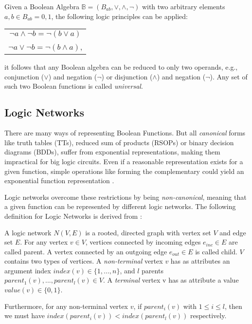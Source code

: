 \begin{definition}
	Given a Boolean Algebra $\mathbb{B} = (B_{ab}, \vee, \wedge, \neg)$ with two arbitrary elements $a,b \in B_{ab} = {0, 1}$, the following logic principles can be applied:
	\begin{table}[h]
		\centering
		\begin{tabular}{c}
			$\neg a \wedge \neg b = \neg (b \vee a)$ \\
			$\neg a \vee \neg b = \neg (b \wedge a)$,
		\end{tabular}
	\end{table}
\end{definition}

it follows that any Boolean algebra can be reduced to only two operands, e.g., conjunction ($\vee$) and negation ($\neg$) or disjunction ($\wedge$) and negation ($\neg$). Any set of such two Boolean functions is called \textit{universal}.

\subsection{Logic Networks}

There are many ways of representing Boolean Functions. But all \textit{canonical} forms like truth tables (TTs), reduced sum of products (RSOPs) or binary decision diagrams (BDDs), suffer from exponential representations, making them impractical for big logic circuits. Even if a reasonable representation exists for a given function, simple operations like forming the complementary could yield an exponential function representation \cite{canonical}.

Logic networks overcome these restrictions by being \textit{non-canonical}, meaning that a given function can be represented by different logic networks. The following definition for Logic Networks is derived from \cite{LogicNetwork}:

\begin{definition}
	A logic network $N(V, E)$ is a rooted, directed graph with vertex set $V$ and edge set $E$. For any vertex $v \in V$, vertices connected by incoming edges $e_{inc} \in E$ are called parent. A vertex connected by an outgoing edge $e_{out} \in E$ is called child.
	$V$ contains two types of vertices. A \textit{non-terminal} vertex $v$ has as attributes an argument index $index(v) \in \{1, . . .,n\}$, and $l$ parents $parent_1(v), ..., parent_l(v) \in V$. 
	A \textit{terminal} vertex v has as attribute a value $value(v)\in\{0,1\}$.
	
	Furthermore, for any non-terminal vertex $v$, if $parent_i(v)$ with $ 1 \leq i \leq l$, then we must have $index(parent_i(v)) < index(parent_l(v))$ respectively.
\end{definition}


